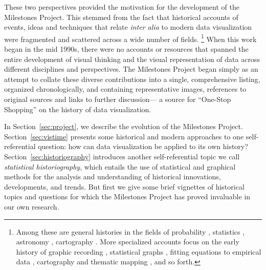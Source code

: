 \documentclass[11pt]{article}
\newcommand*{\secref}[1]{Section~\ref{#1}}
\begin{document}
These two perspectives provided the motivation for the development of the Milestones Project.
This stemmed from the fact that historical accounts of events, ideas and techniques that
relate \emph{inter alia} to modern data visualization were fragmented and
scattered across a wide number of fields.%
\footnote{
Among these are general histories
in the fields of probability \citep{Hald:1990}, statistics
\citep{Pearson:1978,Porter:1986,Stigler:1986}, astronomy \citep{Riddell:1980}, cartography \citep{WallisRobinson:87}.
More specialized accounts focus on the early history of graphic recording
\citep{HoffGeddes:1959,HoffGeddes:1962}, statistical graphs
\citep{Funkhouser:1936,Funkhouser:1937,Royston:1970,Tilling:1975}, fitting equations to empirical data
\citep{Farebrother:1999}, cartography \citep{Friis:1974,Kruskal:1977} and thematic mapping
\citep{FriendlyPalsky:2007,Palsky:1996,Robinson:1982}, and so forth.
}
When this work began in the mid 1990s, there were no accounts or resources that spanned the entire development
of visual thinking and the visual representation of data across different disciplines and perspectives.
The Milestones Project began simply as an attempt to collate these diverse contributions into a single,
comprehensive listing, organized chronologically, and containing representative images, references to
original sources and links to further discussion--- a source for ``One-Stop Shopping'' on the history of
data visualization.

In \secref{sec:project}, we describe the evolution of the Milestones Project. \secref{sec:vistime}
presents some historical and modern approaches to one self-referential question: how can data
visualization be applied to its own history? \secref{sec:historiography} introduces another self-referential
topic we
call \emph{statistical historiography},
which entails the use of statistical and graphical methods for the analysis and understanding of historical innovations, developments, and trends.
But first we give some brief vignettes of historical topics and questions for which the Milestones Project has
proved invaluable in our own research.

\end{document}
